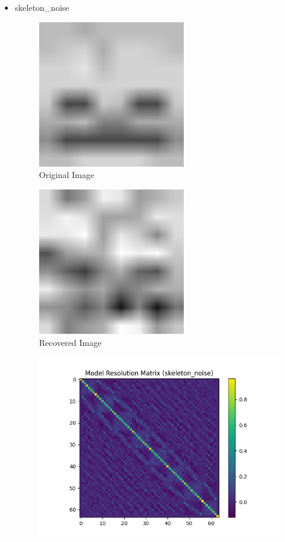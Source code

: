 \documentclass{article}
\begin{document}
\begin{itemize}
        \item skeleton\_noise
    \begin{figure}[h]
        \centering
        \includegraphics[width=0.6\textwidth]{images/greyscale/skeleton.png}
        \caption{Original Image}
    \end{figure}
    \begin{figure}[h]
        \centering
        \includegraphics[width=0.6\textwidth]{images/outputs/noise/skeleton_noise.png}
        \caption{Recovered Image}
    \end{figure}
    \begin{figure}[h]
        \centering
        \includegraphics[width=1\textwidth]{images/outputs/modelres/skeleton_noise.png}

\end{figure}
\end{itemize}
\end{document}
